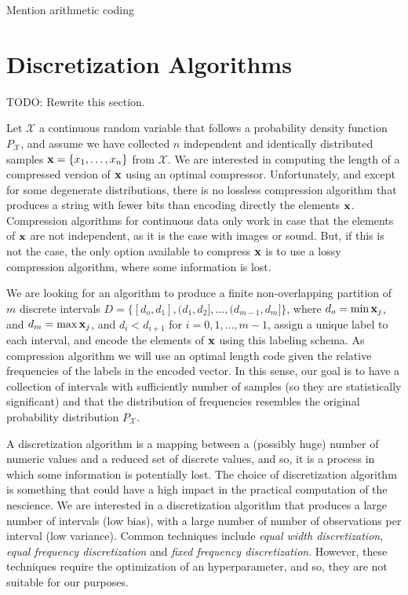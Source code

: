 {\color{red} Mention arithmetic coding}

%
%

\section{Discretization Algorithms}
\label{sec:discretization_algorithms}

{\color{red} TODO: Rewrite this section.}

Let $\mathcal{X}$ a continuous random variable that follows a probability density function $P_\mathcal{X}$, and assume we have collected $n$ independent and identically distributed samples $\bold{x} = \{x_1, \ldots, x_n\}$ from $\mathcal{X}$. We are interested in computing the length of a compressed version of $\bold{x}$ using an optimal compressor. Unfortunately, and except for some degenerate distributions, there is no lossless compression algorithm that produces a string with fewer bits than encoding directly the elements $\bold{x}$. Compression algorithms for continuous data only work in case that the elements of $\bold{x}$ are not independent, as it is the case with images or sound. But, if this is not the case, the only option available to compress $\bold{x}$ is to use a lossy compression algorithm, where some information is lost.

We are looking for an algorithm to produce a finite non-overlapping partition of $m$ discrete intervals $D=\{ [d_o, d_1], (d_1, d_2], \ldots, (d_{m-1}, d_m] \}$, where $d_o = \min{\bold{x}_j}$, and $d_m = \max{\bold{x}_j}$, and $d_i < d_{i+1}$ for $i = 0, 1, \ldots, m-1$, assign a unique label to each interval, and encode the elements of $\bold{x}$ using this labeling schema. As compression algorithm we will use an optimal length code given the relative frequencies of the labels in the encoded vector. In this sense, our goal is to have a collection of intervals with sufficiently number of samples (so they are statistically significant) and that the distribution of frequencies resembles the original probability distribution $P_\mathcal{X}$.

A discretization algorithm is a mapping between a (possibly huge) number of numeric values and a reduced set of discrete values, and so, it is a process in which some information is potentially lost. The choice of discretization algorithm is something that could have a high impact in the practical computation of the nescience. We are interested in a discretization algorithm that produces a large number of intervals (low bias), with a large number of number of observations per interval (low variance). Common techniques include \emph{equal width discretization}, \emph{equal frequency discretization} and \emph{fixed frequency discretization}. However, these techniques require the optimization of an hyperparameter, and so, they are not suitable for our purposes.

